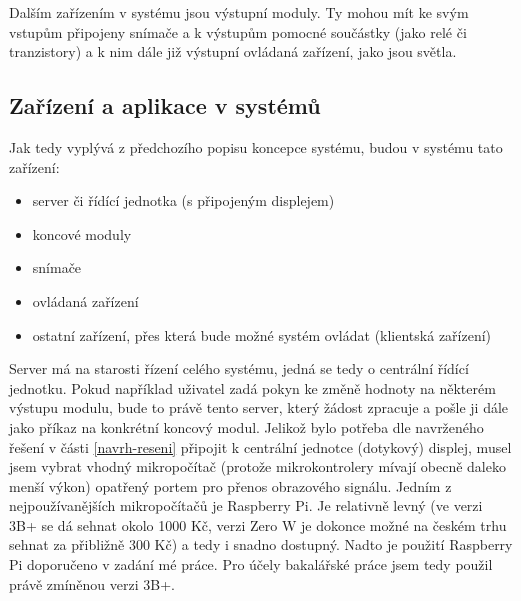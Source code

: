 Dalším zařízením v systému jsou výstupní moduly. Ty mohou mít ke svým vstupům připojeny snímače a k výstupům pomocné součástky (jako relé či tranzistory) a k nim dále již výstupní ovládaná zařízení, jako jsou světla.

\subsection*{Zařízení a aplikace v systémů}
Jak tedy vyplývá z předchozího popisu koncepce systému, budou v systému tato zařízení:
\begin{itemize}
    \item server či řídící jednotka (s připojeným displejem)
    \item koncové moduly
    \item snímače
    \item ovládaná zařízení
    \item ostatní zařízení, přes která bude možné systém ovládat (klientská zařízení)
\end{itemize}

Server má na starosti řízení celého systému, jedná se tedy o centrální řídící jednotku. Pokud například uživatel zadá pokyn ke změně hodnoty na některém výstupu modulu, bude to právě tento server, který žádost zpracuje a pošle ji dále jako příkaz na konkrétní koncový modul. 
Jelikož bylo potřeba dle navrženého řešení v části \ref{navrh-reseni} připojit k centrální jednotce (dotykový) displej, musel jsem vybrat vhodný mikropočítač (protože mikrokontrolery mívají obecně daleko menší výkon) opatřený portem pro přenos obrazového signálu. Jedním z nejpoužívanějších mikropočítačů je Raspberry Pi. Je relativně levný (ve verzi 3B+ se dá sehnat okolo 1000 Kč, verzi Zero W je dokonce možné na českém trhu sehnat za přibližně 300 Kč) a tedy i snadno dostupný. Nadto je použití Raspberry Pi doporučeno v zadání mé práce. Pro účely bakalářské práce jsem tedy použil právě zmíněnou verzi 3B+. 

